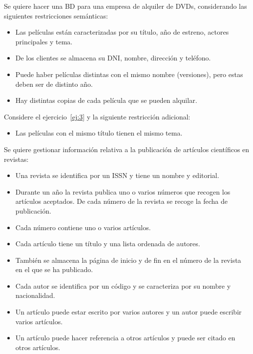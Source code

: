 \begin{ejercicio} \label{ej:3}
    Se quiere hacer una BD para una empresa de alquiler de DVDs, considerando las siguientes restricciones semánticas:
    \begin{itemize}
        \item Las películas están caracterizadas por su título, año de estreno, actores principales y tema.
        \item De los clientes se almacena su DNI, nombre, dirección y teléfono.
        \item Puede haber películas distintas con el mismo nombre (versiones), pero estas deben ser de distinto año.
        \item Hay distintas copias de cada película que se pueden alquilar.
    \end{itemize}
\end{ejercicio}

\begin{ejercicio} \label{ej:4}
    Considere el ejercicio~\ref{ej:3} y la siguiente restricción adicional:
    \begin{itemize}
        \item Las películas con el mismo título tienen el mismo tema.
    \end{itemize}
\end{ejercicio}

\begin{ejercicio} \label{ej:5}
    Se quiere gestionar información relativa a la publicación de artículos científicos en revistas:
    \begin{itemize}
        \item Una revista se identifica por un ISSN y tiene un nombre y editorial.
        \item Durante un año la revista publica uno o varios números que recogen los artículos aceptados. De cada número de la revista se recoge la fecha de publicación.
        \item Cada número contiene uno o varios artículos.
        \item Cada artículo tiene un título y una lista ordenada de autores.
        \item También se almacena la página de inicio y de fin en el número de la revista en el que se ha publicado.
        \item Cada autor se identifica por un código y se caracteriza por su nombre y nacionalidad.
        \item Un artículo puede estar escrito por varios autores y un autor puede escribir varios artículos.
        \item Un artículo puede hacer referencia a otros artículos y puede ser citado en otros artículos.
    \end{itemize}
\end{ejercicio}

